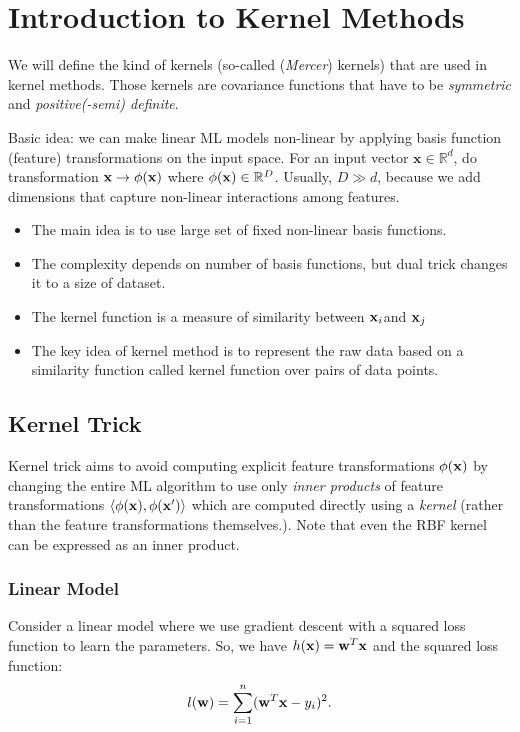 \chapter{Introduction to Kernel Methods}
We will define the kind of kernels (so-called (\textit{Mercer}) kernels) that are used in kernel methods. Those kernels are covariance functions that have to be \textit{symmetric} and \textit{positive(-semi) definite}.

Basic idea: we can make linear ML models non-linear by applying basis function (feature) transformations on the input space. For an input vector $\mathbf{x}\in \mathbb{R}^d$, do transformation $\mathbf{x}\to \phi({\mathbf{x}})$ where $\phi({\mathbf{x}})\in \mathbb{R}^D$. Usually, $D\gg d$, because we add dimensions that capture non-linear interactions among features. 

\begin{itemize}
	\item The main idea is to use large set of fixed non-linear basis functions.
	\item The complexity depends on number of basis functions, but dual trick changes it to a size of dataset. 
	\item The kernel function is a measure of similarity between ${\mathbf{x}}_i$and ${\mathbf{x}}_j$ 
	\item The key idea of kernel method is to represent the raw data based on a similarity function called kernel function over pairs of data points. 
\end{itemize}


\section{Kernel Trick}
\label{sec:kernel:kernel_trick}

Kernel trick aims to avoid computing explicit feature transformations $\phi({\mathbf{x}})$ by changing the entire ML algorithm to use only \textit{inner products} of feature transformations $\langle \phi({\mathbf{x}}), \phi({\mathbf{x}}')\rangle$ which are computed directly using a \textit{kernel} (rather than the feature transformations themselves.). Note that even the RBF kernel can be expressed as an inner product. 

\subsection{Linear Model}

Consider a linear model where we use gradient descent with a squared loss function to learn the parameters. So, we have $h({\mathbf{x}}) = \mathbf{w}^T\mathbf{x}$ and the squared loss function:
$$l({\mathbf{w}}) = \sum_{i=1}^{n}({\mathbf{w}}^T{\mathbf{x}} - y_i)^2.$$

